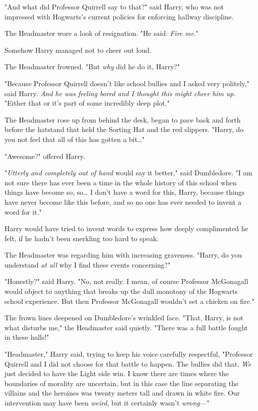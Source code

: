 "And what did Professor Quirrell say to that?" said Harry, who was not 
impressed with Hogwarts's current policies for enforcing hallway discipline.

The Headmaster wore a look of resignation. "He said: \emph{Fire me}."

Somehow Harry managed not to cheer out loud.

The Headmaster frowned. "But \emph{why} did he do it, Harry?"

"Because Professor Quirrell doesn't like school bullies and I asked very 
politely," said Harry. \emph{And he was feeling bored and I thought this might 
cheer him up.} "Either that or it's part of some incredibly deep plot."

The Headmaster rose up from behind the desk, began to pace back and forth 
before the hatstand that held the Sorting Hat and the red slippers. "Harry, do 
you not feel that all of this has gotten a bit{\ldots}"

"Awesome?" offered Harry.

"\emph{Utterly and completely out of hand} would say it better," said 
Dumbledore. "I am not sure there has ever been a time in the whole history of 
this school when things have become so, so{\ldots} I don't have a word for 
this, Harry, because things have never become like this before, and so no one 
has ever needed to invent a word for it."

Harry would have tried to invent words to express how deeply complimented he 
felt, if he hadn't been snerkling too hard to speak.

The Headmaster was regarding him with increasing graveness. "Harry, do you 
understand \emph{at all} why I find these events concerning?"

"Honestly?" said Harry. "No, not really. I mean, of course Professor McGonagall 
would object to anything that breaks up the dull monotony of the Hogwarts 
school experience. But then Professor McGonagall wouldn't set a chicken on 
fire."

The frown lines deepened on Dumbledore's wrinkled face. "That, Harry, is not 
what disturbs me," the Headmaster said quietly. "There was a full battle fought 
in these halls!"

"Headmaster," Harry said, trying to keep his voice carefully respectful, 
"Professor Quirrell and I did not choose for that battle to happen. The bullies 
did that. \emph{We} just decided to have the Light side win. I know there are 
times where the boundaries of morality are uncertain, but in this case the line 
separating the villains and the heroines was twenty meters tall and drawn in 
white fire. Our intervention may have been \emph{weird}, but it certainly 
wasn't \emph{wrong}---"

